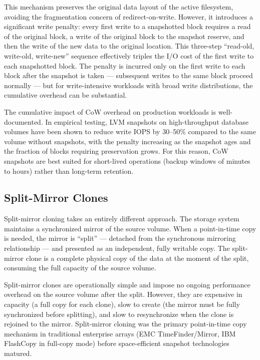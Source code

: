This mechanism preserves the original data layout of the active filesystem, avoiding the fragmentation concern of redirect-on-write. However, it introduces a significant write penalty: every first write to a snapshotted block requires a read of the original block, a write of the original block to the snapshot reserve, and then the write of the new data to the original location. This three-step ``read-old, write-old, write-new'' sequence effectively triples the I/O cost of the first write to each snapshotted block. The penalty is incurred only on the first write to each block after the snapshot is taken --- subsequent writes to the same block proceed normally --- but for write-intensive workloads with broad write distributions, the cumulative overhead can be substantial.

The cumulative impact of CoW overhead on production workloads is well-documented. In empirical testing, LVM snapshots on high-throughput database volumes have been shown to reduce write IOPS by 30--50\% compared to the same volume without snapshots, with the penalty increasing as the snapshot ages and the fraction of blocks requiring preservation grows. For this reason, CoW snapshots are best suited for short-lived operations (backup windows of minutes to hours) rather than long-term retention.

\subsection{Split-Mirror Clones}

Split-mirror cloning takes an entirely different approach. The storage system maintains a synchronized mirror of the source volume. When a point-in-time copy is needed, the mirror is ``split'' --- detached from the synchronous mirroring relationship --- and presented as an independent, fully writable copy. The split-mirror clone is a complete physical copy of the data at the moment of the split, consuming the full capacity of the source volume.

Split-mirror clones are operationally simple and impose no ongoing performance overhead on the source volume after the split. However, they are expensive in capacity (a full copy for each clone), slow to create (the mirror must be fully synchronized before splitting), and slow to resynchronize when the clone is rejoined to the mirror. Split-mirror cloning was the primary point-in-time copy mechanism in traditional enterprise arrays (EMC TimeFinder/Mirror, IBM FlashCopy in full-copy mode) before space-efficient snapshot technologies matured.

